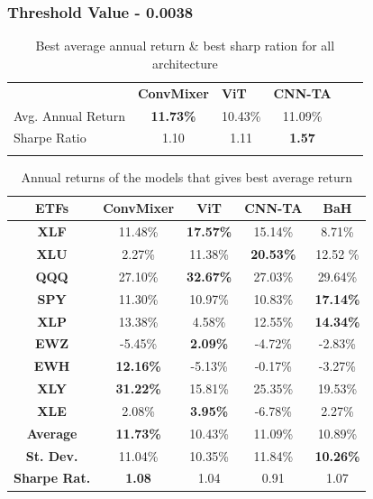 \documentclass[]{article}
\begin{document}
\subsubsection{Threshold Value - 0.0038}
\begin{table}[H]
    \centering
    \caption{Best average annual return \& best sharp ration for all architecture}
    \begin{tabular}{lcccll}
        \cline{1-4}
        \multicolumn{1}{|l|}{} & \multicolumn{1}{l|}{\textbf{ConvMixer}} & \multicolumn{1}{l|}{\textbf{ViT}} & \multicolumn{1}{l|}{\textbf{CNN-TA}} & & \\ \cline{1-4} \multicolumn{1}{|l|}{Avg. Annual Return} & \multicolumn{1}{c|}{\textbf{11.73\%}} & \multicolumn{1}{c|}{10.43\%} & \multicolumn{1}{c|}{11.09\%} & & \\\cline{1-4} \multicolumn{1}{|l|}{Sharpe Ratio} & \multicolumn{1}{c|}{1.10} & \multicolumn{1}{c|}{1.11} & \multicolumn{1}{c|}{\textbf{1.57}} &  &  \\\cline{1-4} \multicolumn{1}{l}{} & \multicolumn{1}{l}{} & \multicolumn{1}{l}{} & &
    \end{tabular}
\end{table}
\begin{table}[H]
\centering
 \begin{tabular}{c c c c c} 
 \hline
\textbf{ETFs} & \textbf{ConvMixer} & \textbf{ViT} & \textbf{CNN-TA} & \textbf{BaH} \\ [0.5ex] 
 \hline\hline
\textbf{XLF} & 11.48\% & \textbf{17.57\%} & 15.14\% & 8.71\% \\
 \hline
\textbf{XLU} & 2.27\% & 11.38\% & \textbf{20.53\%} & 12.52 \% \\
 \hline
\textbf{QQQ} & 27.10\% & \textbf{32.67\%} & 27.03\% & 29.64\% \\
 \hline
\textbf{SPY} & 11.30\% & 10.97\% & 10.83\% & \textbf{17.14\%} \\
 \hline
\textbf{XLP} & 13.38\% & 4.58\% & 12.55\% & \textbf{14.34\%} \\
 \hline
\textbf{EWZ} & -5.45\% & \textbf{2.09\%} & -4.72\% & -2.83\% \\
 \hline
\textbf{EWH} & \textbf{12.16\%} & -5.13\% & -0.17\% & -3.27\% \\
 \hline
\textbf{XLY} & \textbf{31.22\%} & 15.81\% & 25.35\% & 19.53\% \\
 \hline
\textbf{XLE} & 2.08\% & \textbf{3.95\%} & -6.78\% & 2.27\% \\
 \hline
\textbf{Average} & \textbf{11.73\%} & 10.43\% & 11.09\% & 10.89\% \\
 \hline
\textbf{St. Dev.} & 11.04\% & 10.35\% & 11.84\% & \textbf{10.26\%} \\
 \hline
\textbf{Sharpe Rat.} & \textbf{1.08} & 1.04 & 0.91 & 1.07 \\
 \hline
 \end{tabular}
 \caption{Annual returns of the models that gives best average return}
\end{table}
\end{document}
